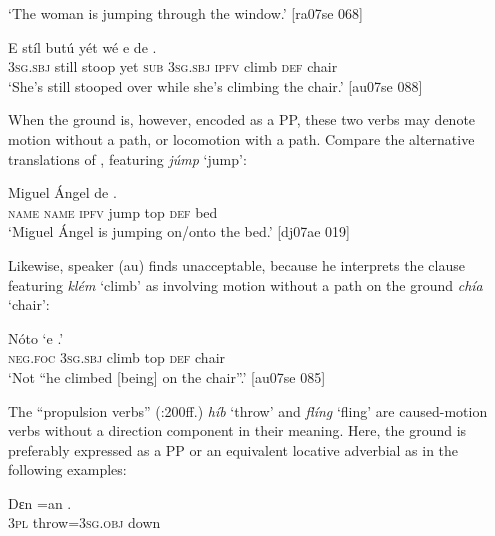 \glt ‘The woman is jumping through the window.’ [ra07se 068]
\z


\ea%
    \label{ex:key:963}
    \gll E    stíl  butú  yét  wé  e    de      .\\
\textsc{3sg.sbj}  still  stoop  yet  \textsc{sub}  \textsc{3sg.sbj}  \textsc{ipfv}  climb  \textsc{def}  chair\\

\glt ‘She’s still stooped over while she’s climbing the chair.’ [au07se 088]
\z

When the ground is, however, encoded as a PP, these two verbs may denote motion without a path, or locomotion with a path. Compare the alternative translations of , featuring \textit{júmp} ‘jump’: 


\ea%
    \label{ex:key:964}
    \gll Miguel  Ángel  de        .\\
\textsc{name}  \textsc{name}  \textsc{ipfv}  jump  top    \textsc{def}  bed\\

\glt ‘Miguel Ángel is jumping on/onto the bed.’ [dj07ae 019]
\z

Likewise, speaker (au) finds  unacceptable, because he interprets the clause featuring \textit{klém} ‘climb’ as involving motion without a path on the ground\textit{ chía} ‘chair’:


\ea%
    \label{ex:key:965}
    \gll Nóto  ‘e          .’\\
\textsc{neg}.\textsc{foc}  \textsc{3sg.sbj}  climb  top    \textsc{def}  chair\\

\glt ‘Not “he climbed [being] on the chair”.’ [au07se 085]
\z

The “propulsion verbs” (\citealt{Longacre1996}:200ff.) \textit{híb} ‘throw’ and \textit{flíng} ‘fling’ are caused-motion verbs without a direction component in their meaning. Here, the ground is preferably expressed as a PP or an equivalent locative adverbial as in the following examples: 


\ea%
    \label{ex:key:966}
    \gll Dɛn  =an    .\\
\textsc{3pl}  throw=\textsc{3sg.obj}  down\\

